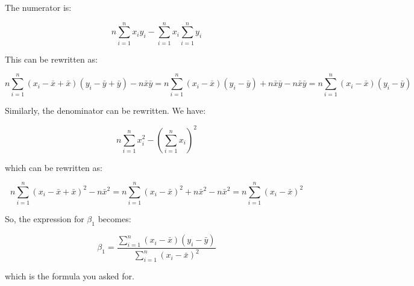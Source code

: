 \documentclass[12pt,a4paper, brazil]{article}
\begin{document}
The numerator is:

\[
n \sum_{i=1}^{n} x_i y_i - \sum_{i=1}^{n} x_i \sum_{i=1}^{n} y_i
\]

This can be rewritten as:

\[
n \sum_{i=1}^{n} (x_i - \bar{x} + \bar{x})(y_i - \bar{y} + \bar{y}) - n \bar{x}\bar{y}
= n \sum_{i=1}^{n} (x_i - \bar{x})(y_i - \bar{y}) + n \bar{x}\bar{y} - n \bar{x}\bar{y}
= n \sum_{i=1}^{n} (x_i - \bar{x})(y_i - \bar{y})
\]

Similarly, the denominator can be rewritten. We have:

\[
n \sum_{i=1}^{n} x_i^2 - (\sum_{i=1}^{n} x_i)^2
\]

which can be rewritten as:

\[
n \sum_{i=1}^{n} (x_i - \bar{x} + \bar{x})^2 - n \bar{x}^2
= n \sum_{i=1}^{n} (x_i - \bar{x})^2 + n \bar{x}^2 - n \bar{x}^2
= n \sum_{i=1}^{n} (x_i - \bar{x})^2
\]

So, the expression for \(\beta_1\) becomes:

\[
\beta_1 = \frac{\sum_{i=1}^{n} (x_i - \bar{x})(y_i - \bar{y})}{\sum_{i=1}^{n} (x_i - \bar{x})^2}
\]

which is the formula you asked for.

\printbibliography
\end{document}

